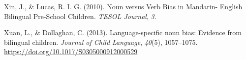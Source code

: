 \documentclass[10pt, letterpaper]{article}
\begin{document}
\begin{CSLReferences}{1}{0}
Xin, J., \& Lucas, R. I. G. (2010). Noun versus {Verb Bias} in
{Mandarin- English Bilingual Pre-School Children}. \emph{TESOL Journal},
\emph{3}.

Xuan, L., \& Dollaghan, C. (2013). Language-specific noun bias: Evidence
from bilingual children. \emph{Journal of Child Language}, \emph{40}(5),
1057--1075. \url{https://doi.org/10.1017/S0305000912000529}

\end{CSLReferences}


\end{document}
